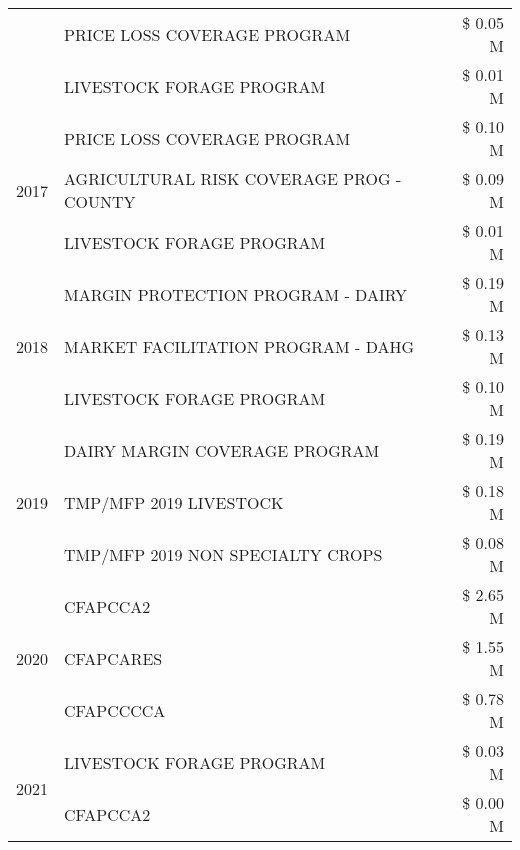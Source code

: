 \begin{tabular}{llr}
 & PRICE LOSS COVERAGE PROGRAM & \$ 0.05 M \\
 & LIVESTOCK FORAGE PROGRAM & \$ 0.01 M \\
\cline{1-3}
\multirow[t]{3}{*}{2017} & PRICE LOSS COVERAGE PROGRAM & \$ 0.10 M \\
 & AGRICULTURAL RISK COVERAGE PROG - COUNTY & \$ 0.09 M \\
 & LIVESTOCK FORAGE PROGRAM & \$ 0.01 M \\
\cline{1-3}
\multirow[t]{3}{*}{2018} & MARGIN PROTECTION PROGRAM - DAIRY & \$ 0.19 M \\
 & MARKET FACILITATION PROGRAM - DAHG & \$ 0.13 M \\
 & LIVESTOCK FORAGE PROGRAM & \$ 0.10 M \\
\cline{1-3}
\multirow[t]{3}{*}{2019} & DAIRY MARGIN COVERAGE PROGRAM & \$ 0.19 M \\
 & TMP/MFP 2019 LIVESTOCK & \$ 0.18 M \\
 & TMP/MFP 2019 NON SPECIALTY CROPS & \$ 0.08 M \\
\cline{1-3}
\multirow[t]{3}{*}{2020} & CFAPCCA2 & \$ 2.65 M \\
 & CFAPCARES & \$ 1.55 M \\
 & CFAPCCCCA & \$ 0.78 M \\
\cline{1-3}
\multirow[t]{2}{*}{2021} & LIVESTOCK FORAGE PROGRAM & \$ 0.03 M \\
 & CFAPCCA2 & \$ 0.00 M \\
\cline{1-3}
\bottomrule
\end{tabular}
